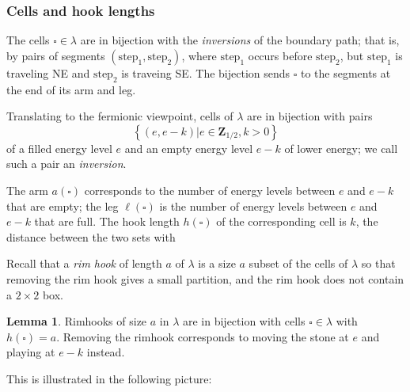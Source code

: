 \documentclass{amsart}[12pt]
\theoremstyle{definition}
\newtheorem{lemma}[dummy]{Lemma}
\newcommand{\Z}{\mathbf{Z}}
\begin{document}
\subsubsection{Cells and hook lengths}

The cells $\square\in\lambda$ are in bijection with the
\emph{inversions} of the boundary path; that is, by pairs of segments
$(\text{step}_1, \text{step}_2)$, where $\text{step}_1$ occurs before $\text{step}_2$,
but $\text{step}_1$ is traveling NE and $\text{step}_2$ is traveing SE.  The bijection
sends $\square$ to the segments at the end of its arm and leg.

Translating to the fermionic viewpoint, cells of $\lambda$ are in
bijection with pairs 
$$\left\{(e, e-k)\big | e\in\Z_{1/2}, k>0\right\}$$ of a filled energy level $e$ and an
empty energy level $e-k$ of lower energy; we call such a pair an \emph{inversion}.  

The arm $a(\square)$ corresponds to the number of energy levels between $e$ and $e-k$ that are empty; the leg $\ell(\square)$ is the number of energy levels between $e$ and $e-k$ that are full.  The hook length $h(\square)$ of the corresponding cell is $k$, the distance between the two sets with 

Recall that a \emph{rim hook} of length $a$ of $\lambda$ is a size $a$ subset of the cells of $\lambda$ so that removing the rim hook gives a small partition, and the rim hook does not contain a $2\times 2$ box.  

\begin{lemma}
Rimhooks of size $a$ in $\lambda$ are in bijection with cells $\square\in\lambda$ with $h(\square)=a$.  Removing the rimhook corresponds to moving the stone at $e$ and playing at $e-k$ instead.
\end{lemma}

This is illustrated in the following picture:
\end{document}

